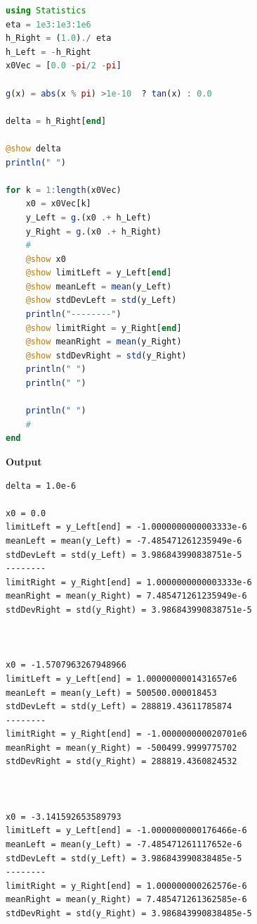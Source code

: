 \begin{lstlisting}[language=Julia,style=mystyle]
using Statistics
eta = 1e3:1e3:1e6
h_Right = (1.0)./ eta
h_Left = -h_Right
x0Vec = [0.0 -pi/2 -pi]

g(x) = abs(x % pi) >1e-10  ? tan(x) : 0.0

delta = h_Right[end]

@show delta
println(" ")

for k = 1:length(x0Vec)
    x0 = x0Vec[k]
    y_Left = g.(x0 .+ h_Left)
    y_Right = g.(x0 .+ h_Right)
    #
    @show x0
    @show limitLeft = y_Left[end]
    @show meanLeft = mean(y_Left)
    @show stdDevLeft = std(y_Left)
    println("--------")
    @show limitRight = y_Right[end]
    @show meanRight = mean(y_Right)
    @show stdDevRight = std(y_Right)    
    println(" ")
    println(" ")
    
    println(" ")
    #
end
\end{lstlisting}
\textbf{Output} 
\begin{verbatim}
delta = 1.0e-6
 
x0 = 0.0
limitLeft = y_Left[end] = -1.0000000000003333e-6
meanLeft = mean(y_Left) = -7.485471261235949e-6
stdDevLeft = std(y_Left) = 3.986843990838751e-5
--------
limitRight = y_Right[end] = 1.0000000000003333e-6
meanRight = mean(y_Right) = 7.485471261235949e-6
stdDevRight = std(y_Right) = 3.986843990838751e-5
 
 
 
x0 = -1.5707963267948966
limitLeft = y_Left[end] = 1.0000000001431657e6
meanLeft = mean(y_Left) = 500500.000018453
stdDevLeft = std(y_Left) = 288819.43611785874
--------
limitRight = y_Right[end] = -1.000000000020701e6
meanRight = mean(y_Right) = -500499.9999775702
stdDevRight = std(y_Right) = 288819.4360824532
 
 
 
x0 = -3.141592653589793
limitLeft = y_Left[end] = -1.0000000000176466e-6
meanLeft = mean(y_Left) = -7.485471261117652e-6
stdDevLeft = std(y_Left) = 3.986843990838485e-5
--------
limitRight = y_Right[end] = 1.000000000262576e-6
meanRight = mean(y_Right) = 7.485471261362585e-6
stdDevRight = std(y_Right) = 3.986843990838485e-5
\end{verbatim}
\Qed

\bigskip

